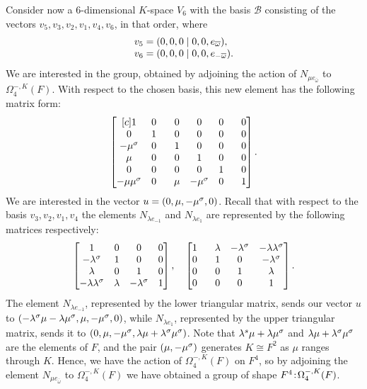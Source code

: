 Consider now a $6$-dimensional $K$-space $V_6$ with the basis $\mathcal{B}$ consisting of the vectors
$v_5, v_3, v_2, v_1, v_4, v_6$, in that order, where
\begin{equation}
	\begin{array}{r@{\;}c@{\;}l}
		v_5 & = & (0,0,0\mid 0,0,e_{\bar{\omega}}), \\
		v_6 & = & (0,0,0\mid 0,0,e_{-\bar{\omega}}). \\
	\end{array} 
\end{equation}
We are interested in the group, obtained by adjoining the action of $N_{\mu e_{\bar{\omega}}}$ to 
$\Omega_4^{-,K}(F)$. With respect to the chosen basis, this new element has the following matrix form:
\begin{equation}
	\begin{bmatrix}[c]
		1 & 0 &  \phantom{-}0 & 0 & 0 & \phantom{-}0 \\
		0 & 1 & \phantom{-}0 & 0 & 0 & \phantom{-}0 \\
		-\mu^{\sigma} & 0 & \phantom{-}1 & 0 & 0 & \phantom{-}0 \\
		\mu & 0 & \phantom{-}0 & 1 & 0 & \phantom{-}0 \\
		0 & 0 & \phantom{-}0 & 0 & 1 & \phantom{-}0 \\
		-\mu \mu^{\sigma} & 0 & \phantom{-}\mu & -\mu^{\sigma} & 0 & \phantom{-}1
	\end{bmatrix}.
\end{equation}
We are interested in the vector $u = (0,\mu, -\mu^{\sigma}, 0)$. Recall that with respect to the basis
$v_3, v_2, v_1, v_4$ the elements $N_{\lambda e_{-1}}$ and $N_{\lambda e_1}$ are represented 
by the following matrices respectively:
\begin{equation}
		 \begin{bmatrix}
			1 & 0 & 0 & 0 \\
			-\lambda^{\sigma} & 1 & 0 & 0 \\
			\lambda & 0 & 1 & 0 \\
			-\lambda\lambda^{\sigma} & \lambda & -\lambda^{\sigma} & 1
		\end{bmatrix},\quad 
		\begin{bmatrix}
			1 & \phantom{-}\lambda & -\lambda^{\sigma} & -\lambda\lambda^{\sigma} \\
			0 & \phantom{-}1 & 0 & -\lambda^{\sigma} \\
			0 & \phantom{-}0 & 1 & \lambda \\
			0 & \phantom{-}0 & 0 & 1
		\end{bmatrix}.	
\end{equation}
The element $N_{\lambda e_{-1}}$, represented by the lower triangular matrix, sends our vector
$u$
to $(-\lambda^{\sigma} \mu - \lambda\mu^{\sigma}, \mu, -\mu^{\sigma}, 0)$, while 
$N_{\lambda e_1}$, represented by the upper triangular matrix, sends it to
$(0,\mu, -\mu^{\sigma}, \lambda\mu + \lambda^{\sigma}\mu^{\sigma})$. Note that
$\lambda^{s}\mu + \lambda\mu^{\sigma}$ and $\lambda\mu + \lambda^{\sigma}\mu^{\sigma}$ are
the elements of $F$, and the pair $(\mu, -\mu^{\sigma})$ generates $K \cong F^{2}$ as
$\mu$ ranges through $K$. Hence, we have the action of $\Omega_4^{-,K}(F)$ on
$F^4$, so by adjoining the element $N_{\mu e_{\bar{\omega}}}$ to $\Omega_4^{-,K}(F)$
we have obtained a group of shape $F^{4}\mathord{{\;\!{:}\;\!}}\Omega_4^{-,K}(F)$. 

